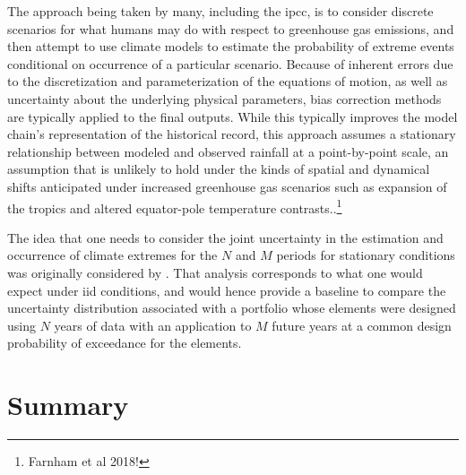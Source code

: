\documentclass[12pt]{article}
\begin{document}
The approach being taken by many, including the \gls{ipcc}, is to consider discrete scenarios for what humans may do with respect to greenhouse gas emissions, and then attempt to use climate models to estimate the probability of extreme events conditional on occurrence of a particular scenario.
Because of inherent errors due to the discretization and parameterization of the equations of motion, as well as uncertainty about the underlying physical parameters, bias correction methods \citep[\eg quantile-quantile mapping;][]{Rajczak2016} are typically applied to the final outputs.
While this typically improves the model chain's representation of the historical record, this approach assumes a stationary relationship between modeled and observed rainfall at a point-by-point scale, an assumption that is unlikely to hold under the kinds of spatial and dynamical shifts anticipated under increased greenhouse gas scenarios such as expansion of the tropics and altered equator-pole temperature contrasts.\citep{Dankers2009,Ott2013,Merz2014,Dittes2017}.\footnote{Farnham et al 2018!}

The idea that one needs to consider the joint uncertainty in the estimation and occurrence of climate extremes for the $N$ and $M$ periods for stationary conditions was originally considered by \citet{Lall1987}.
That analysis corresponds to what one would expect under \gls{iid} conditions, and would hence provide a baseline to compare the uncertainty distribution associated with a portfolio whose elements were designed using $N$ years of data with an application to $M$ future years at a common design probability of exceedance for the elements. 



\section{Summary}
\end{document}
